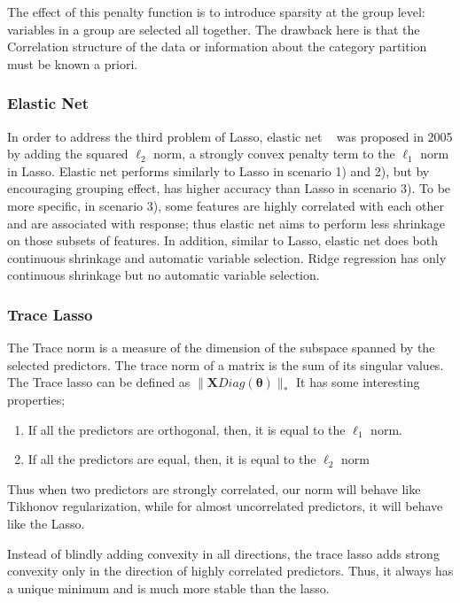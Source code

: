 \documentclass[11pt]{article}
\begin{document}
The effect of this penalty function is to introduce sparsity at the group level: variables in a group are
selected all together.
The drawback here is that the Correlation structure of the data or information about the category partition must be known a priori. 
\subsubsection{Elastic Net}

In order to address the third problem of Lasso, elastic net ~\cite{Zou2005Reg} was proposed in 2005 by adding the squared $\ell_2$ norm, a strongly convex penalty term to the $\ell_1$ norm in Lasso. 
Elastic net performs similarly to Lasso in scenario 1) and 2), but by encouraging grouping effect, has higher accuracy than Lasso in scenario 3). 
To be more specific, in scenario 3), some features are highly correlated with each other and are associated with response; thus elastic net aims to perform less shrinkage on those subsets of features. 
In addition, similar to Lasso, elastic net does both continuous shrinkage and automatic variable selection. Ridge regression has only continuous shrinkage but no automatic variable selection.\\


\subsubsection{Trace Lasso}

The Trace norm is a measure of the dimension of the subspace spanned by the selected predictors.
The trace norm of a matrix is the sum of its singular values. 
The Trace lasso can be defined as $\| \mathbf{X} Diag(\mathbf{\theta})\|_*$
It has some interesting properties;
\begin{enumerate}
\item  If all the predictors are orthogonal, then, it is equal to the $\ell_1$ norm.
\item  If all the predictors are equal, then, it is equal to the $\ell_2$ norm
\end{enumerate}

Thus when two predictors are strongly correlated, our norm will behave like
Tikhonov regularization, while for almost uncorrelated predictors, it will behave like the Lasso.

Instead of blindly adding convexity in all directions, the trace lasso adds strong convexity only in the direction of highly correlated predictors. 
Thus, it always has a unique minimum and is much more stable than the lasso. 
\end{document}
